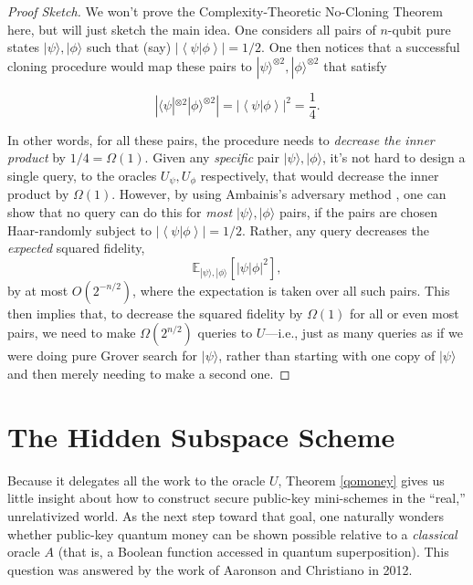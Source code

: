 \documentclass[12pt]{report}
\theoremstyle{plain}
\theoremstyle{definition}
\renewcommand{\bra}[1]{\langle#1|}
\renewcommand{\ket}[1]{|#1\rangle}
\begin{document}
\begin{proof}[Proof Sketch]
We won't prove the Complexity-Theoretic No-Cloning Theorem here, but will just sketch the main idea.  One considers all pairs of $n$-qubit pure states $\ket{\psi},\ket{\phi}$ such that (say) $\left| \left\langle \psi | \phi \right\rangle \right| = 1/2$.  One then notices that a successful cloning procedure would map these pairs to $\ket{\psi}^{\otimes 2},\ket{\phi}^{\otimes 2}$ that satisfy

$$ \left| \bra{\psi}^{\otimes 2} \ket{\phi}^{\otimes 2} \right| = \left| \left\langle \psi | \phi \right\rangle \right|^2 = \frac{1}{4}. $$

In other words, for all these pairs, the procedure needs to {\em decrease the inner product} by $1/4 = \Omega(1)$.  Given any {\em specific} pair $\ket{\psi},\ket{\phi}$, it's not hard to design a single query, to the oracles $U_{\psi},U_{\phi}$ respectively, that would decrease the inner product by $\Omega(1)$.  However, by using Ambainis's adversary method \cite{ambainis}, one can show that no query can do this for {\em most} $\ket{\psi},\ket{\phi}$ pairs, if the pairs are chosen Haar-randomly subject to $\left| \left\langle \psi | \phi \right\rangle \right| = 1/2$.  Rather, any query decreases the {\em expected} squared fidelity,
$$ \mathbb{E}_{\ket{\psi},\ket{\phi}}\left[ \left| \psi | \phi \right|^2 \right], $$
by at most $O(2^{-n/2})$, where the expectation is taken over all such pairs.  This then implies that, to decrease the squared fidelity by $\Omega(1)$ for all or even most pairs, we need to make $\Omega(2^{n/2})$ queries to $U$---i.e., just as many queries as if we were doing pure Grover search for $\ket{\psi}$, rather than starting with one copy of $\ket{\psi}$ and then merely needing to make a second one.
\end{proof}

\section{The Hidden Subspace Scheme}

Because it delegates all the work to the oracle $U$, Theorem \ref{qomoney} gives us little insight about how to construct secure public-key mini-schemes in the ``real,'' unrelativized world.
As the next step toward that goal, one naturally wonders whether public-key quantum money can be shown possible relative to a {\em classical} oracle $A$ (that is, a Boolean function accessed in quantum superposition).  This question was answered by the work of Aaronson and Christiano \cite{achristiano} in 2012.
\end{document}
